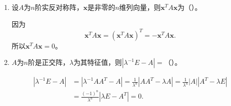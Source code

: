 \begin{enumerate}[1~]
\begin{enumerate}[1.~]
\begin{solution}
\begin{subproof}
\[\lambda _ { 1 } \right) , J _ { r _ { 2 } } \left( \lambda _ { 
2 } \right) , \cdots , J _ { r _ { m } } \left( \lambda _ { m 
} \right) \right\},
\]
其中$\lambda _ { 1 } , \lambda _ { 2 } , 
\dots , \lambda _ { m }$可能有相同的，$r _ { 1 } + r _ { 2 
} + \dots + r _ { m } = n $。据引理1得，$J _ { r _ { i } } 
\left( \lambda _ { i } \right) \sim J _ { r _ { i } } \left( 
\lambda _ { i } \right) ^ { \prime }$，且可逆矩阵$P _ { i } 
= \left\{ \boldsymbol{\varepsilon} _ { r _ { i } } , \boldsymbol{\varepsilon} _ { r _ { i 
} } - 1 , \dots , \boldsymbol{\varepsilon} _ { 2 } , \boldsymbol{\varepsilon} _ { 1 } 
\right\}$使得$P _ { i } ^ { - 1 } J _ { r _ { i } } \left( 
\lambda _ { i } \right) P _ { i } = J _ { r _ { i } } \left( 
\lambda _ { i } \right) ^ { \prime }$。令$P = 
\operatorname { diag } \left\{ P _ { 1 } , P _ { 2 } , \dots 
, P _ { m } \right\}$，则$P ^ { - 1 } J P = J ^ { \prime }
$。从而$J \sim J ^ { \prime }$。由于$A\sim J$，因此
$A'\sim J'$。从而$A\sim A'$。
\end{subproof}
\begin{lemma}
数域$\mathbb{K}$上$n$级矩阵$A$与$B$相似当且仅当把它们看成复矩阵后相似。
\end{lemma}
\begin{subproof}
设数域$\mathbb{K}$上$n$级矩阵$A$的不变因子为$d _ { 1 } ( \lambda ) , d _ { 2 } ( \lambda ) , \dots , d _ { n } ( \lambda )$。把$A$看成复矩阵后，不变因子仍然是$d _ { 1 } ( \lambda ) , d _ { 2 } ( \lambda ) , \dots , d _ { n } ( \lambda )$。因此
\begin{align*}
&\text{数域$\mathbb{K}$上的$n$级矩阵$A$与$B$相似}\\
\Longleftrightarrow &\text{$A$与$B$有相同的不变因子}\\
\Longleftrightarrow &\text{把$A$与$B$看成复矩阵后相似。}
\end{align*}
\end{subproof}
由引理知，$A$与$A^T$相似。
\end{solution}

\item
设$A$为$n$阶实反对称阵，$\boldsymbol{x}$是非零的$n$维列向量，则$\boldsymbol{x}^TA\boldsymbol{x}$为（\quad）。
\begin{solution}
因为\[
\boldsymbol{x}^TA\boldsymbol{x}=(\boldsymbol{x}^TA\boldsymbol{x})^T=-\boldsymbol{x}^TA\boldsymbol{x}.
\]
所以$\boldsymbol{x}^TA\boldsymbol{x}=0$。
\end{solution}

\item
$A$为$n$阶是正交阵，$\lambda$为其特征值，则$\left| \lambda ^ { - 1 } E - A \right| =$（\quad）。
\begin{solution}
\begin{align*}
|\lambda^{-1}E-A|&=|\lambda^{-1}AA^T-A|=\frac{1}{\lambda^n}|AA^T-\lambda A|=\frac{1}{\lambda^n}|A||A^T-\lambda E|\\
&=\frac{(-1)^n}{\lambda^n}|\lambda E-A^T|=0.
\end{align*}
\end{solution}
\end{enumerate}


\end{enumerate}

